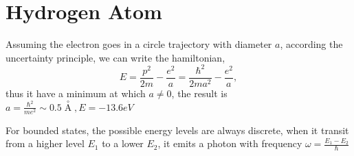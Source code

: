 \section[氢原子]{Hydrogen Atom}
Assuming the electron goes in a circle trajectory with diameter $a$, according the uncertainty principle, we can write the hamiltonian,
\begin{equation}
  E = \frac{p^2}{2m} - \frac{e^2}{a} = \frac{\hbar^2}{2ma^2} - \frac{e^2}{a},
\end{equation}
thus it have a minimum at which $a\neq 0$, the result is $a = \frac{\hbar^2}{me^2} \sim 0.5 \mathop{A}\limits^{\circ}_{}, E = -13.6 eV$

For bounded states, the possible energy levels are always discrete, when it transit from a higher level $E_1$ to a lower $E_2$, it emits a photon with frequency $\omega = \frac{E_1 - E_2}{\hbar}$